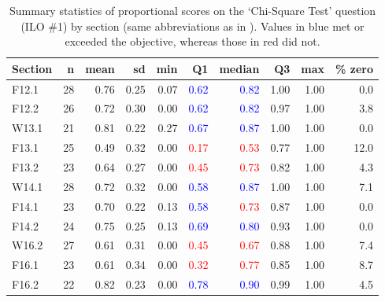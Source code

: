 \documentclass{article}\usepackage[]{graphicx}\usepackage[]{color}
\begin{document}
\begin{table}[h]
\centering
\caption{Summary statistics of proportional scores on the `Chi-Square Test' question (ILO \#1) by section (same abbreviations as in ). Values in blue met or exceeded the objective, whereas those in red did not.} 
\label{tab:sumChi}
\begin{tabular}{lrrrrrrrrr}
  \hline
Section & n & mean & sd & min & \textbf{Q1} & \textbf{median} & Q3 & max & \% zero \\ 
  \hline
F12.1 & 28 & 0.76 & 0.25 & 0.07 & \textcolor{red}{\textcolor{blue}{0.62}} & \textcolor{red}{\textcolor{blue}{0.82}} & 1.00 & 1.00 & 0.0 \\ 
  F12.2 & 26 & 0.72 & 0.30 & 0.00 & \textcolor{red}{\textcolor{blue}{0.62}} & \textcolor{red}{\textcolor{blue}{0.82}} & 0.97 & 1.00 & 3.8 \\ 
  W13.1 & 21 & 0.81 & 0.22 & 0.27 & \textcolor{red}{\textcolor{blue}{0.67}} & \textcolor{red}{\textcolor{blue}{0.87}} & 1.00 & 1.00 & 0.0 \\ 
  F13.1 & 25 & 0.49 & 0.32 & 0.00 & \textcolor{red}{                   0.17} & \textcolor{red}{                   0.53} & 0.77 & 1.00 & 12.0 \\ 
  F13.2 & 23 & 0.64 & 0.27 & 0.00 & \textcolor{red}{                   0.45} & \textcolor{red}{                   0.73} & 0.82 & 1.00 & 4.3 \\ 
  W14.1 & 28 & 0.72 & 0.32 & 0.00 & \textcolor{red}{\textcolor{blue}{0.58}} & \textcolor{red}{\textcolor{blue}{0.87}} & 1.00 & 1.00 & 7.1 \\ 
  F14.1 & 23 & 0.70 & 0.22 & 0.13 & \textcolor{red}{\textcolor{blue}{0.58}} & \textcolor{red}{                   0.73} & 0.87 & 1.00 & 0.0 \\ 
  F14.2 & 24 & 0.75 & 0.25 & 0.13 & \textcolor{red}{\textcolor{blue}{0.69}} & \textcolor{red}{\textcolor{blue}{0.80}} & 0.93 & 1.00 & 0.0 \\ 
  W16.2 & 27 & 0.61 & 0.31 & 0.00 & \textcolor{red}{                   0.45} & \textcolor{red}{                   0.67} & 0.88 & 1.00 & 7.4 \\ 
  F16.1 & 23 & 0.61 & 0.34 & 0.00 & \textcolor{red}{                   0.32} & \textcolor{red}{                   0.77} & 0.85 & 1.00 & 8.7 \\ 
  F16.2 & 22 & 0.82 & 0.23 & 0.00 & \textcolor{red}{\textcolor{blue}{0.78}} & \textcolor{red}{\textcolor{blue}{0.90}} & 0.99 & 1.00 & 4.5 \\ 

\end{tabular}
\end{table}
\end{document}
